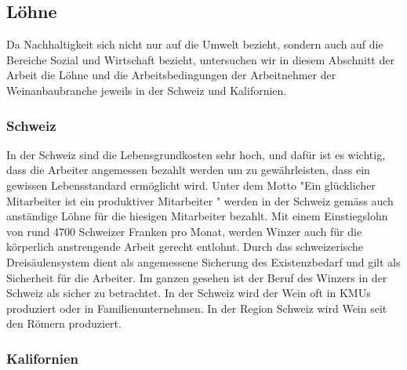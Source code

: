 \subsection{Löhne}
Da Nachhaltigkeit sich nicht nur auf die Umwelt bezieht, sondern auch auf die Bereiche Sozial und Wirtschaft bezieht, untersuchen wir in diesem Abschnitt der Arbeit die Löhne und die Arbeitsbedingungen der Arbeitnehmer der Weinanbaubranche jeweils in der Schweiz und Kalifornien.

\subsubsection{Schweiz}
In der Schweiz sind die Lebensgrundkosten sehr hoch, und dafür ist es wichtig, dass die Arbeiter
angemessen bezahlt werden um zu gewährleisten, dass ein gewissen Lebensstandard ermöglicht wird. Unter dem Motto "Ein glücklicher Mitarbeiter ist ein produktiver Mitarbeiter " werden in der Schweiz gemäss
\cite{_branchenverband} auch anständige Löhne für die hiesigen Mitarbeiter bezahlt. Mit einem Einstiegslohn von rund 4700 Schweizer Franken pro Monat, werden Winzer auch für die körperlich anstrengende Arbeit gerecht entlohnt. Durch das schweizerische Dreisäulensystem dient als angemessene Sicherung des Existenzbedarf und gilt als Sicherheit für die Arbeiter. Im ganzen gesehen ist der Beruf des Winzers in der Schweiz als sicher zu betrachtet. In der Schweiz wird der Wein oft in KMUs produziert oder in Familienunternehmen. In der Region Schweiz wird Wein seit den Römern produziert. 

\subsubsection{Kalifornien}

